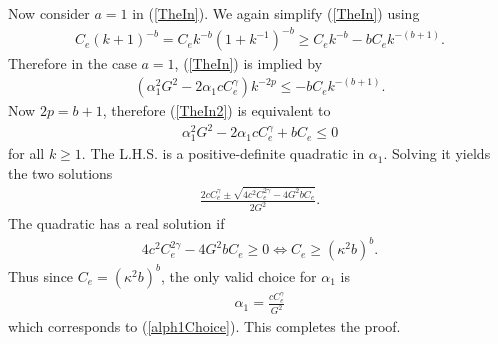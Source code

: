 Now consider $a=1$ in (\ref{TheIn}). We again simplify (\ref{TheIn}) using
\begin{eqnarray*}
C_e(k+1)^{-b}
=
C_e k^{-b}(1+k^{-1})^{-b}
\geq
C_e k^{-b} - b C_e k^{-(b+1)}.
\end{eqnarray*}
Therefore in the case $a=1$, (\ref{TheIn}) is implied by 
\begin{eqnarray}
\left(
\alpha_1^2 G^2
-
2 \alpha_1 c C_e^\gamma
\right)
k^{-2p}
\leq
 - b C_e k^{-(b+1)}\label{TheIn2}.
\end{eqnarray}
Now $2p=b+1$, therefore (\ref{TheIn2}) is equivalent to
\begin{eqnarray*}
\alpha_1^2 G^2
-
2 \alpha_1 c C_e^\gamma+b C_e
\leq
0
\end{eqnarray*}
for all $k\geq 1$. The L.H.S. is a positive-definite quadratic in $\alpha_1$. Solving it yields the two solutions
\begin{eqnarray*}
\frac{
2c C_e^\gamma \pm \sqrt{4c^2C_e^{2\gamma}-4 G^2 b C_e}
}{2 G^2}.
\end{eqnarray*}
The quadratic has a real solution if
\begin{eqnarray}
4c^2C_e^{2\gamma}-4 G^2 b C_e
\geq 
0
\iff
C_e
\geq
\left(
\kappa^2 b\right)^{b}.
\label{CeLowerBound}
\end{eqnarray}
Thus since $C_e=(\kappa^2 b)^b$, the only valid choice for $\alpha_1$ is
\begin{eqnarray*}\label{AlphaVal}
\alpha_1 = \frac{c C_e^\gamma}{G^2}
\end{eqnarray*}
which corresponds to (\ref{alph1Choice}).
This completes the proof.
